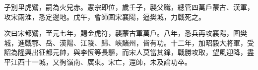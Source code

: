 \begin{pinyinscope}
 子別里虎鷿，嗣為火兒赤。憲宗即位，歲壬子，襲父職，總管四萬戶蒙古、漢軍，攻宋兩淮，悉定邊地。戊午，會師圍宋襄陽，逼樊城，力戰死之。



 次曰宋都鷿，至元七年，賜金虎符，襲蒙古軍萬戶。八年，悉兵再攻襄陽，圍樊城，進戰鄂、岳、漢陽、江陵、歸、峽諸州，皆有功。十二年，加昭毅大將軍，受詔為隆興出征都元帥，與李恆等長驅，而宋人莫當其鋒，戰勝攻取，望風迎降，盡平江西十一城，又徇嶺南、廣東。宋亡，還師，未及論功卒。



\end{pinyinscope}